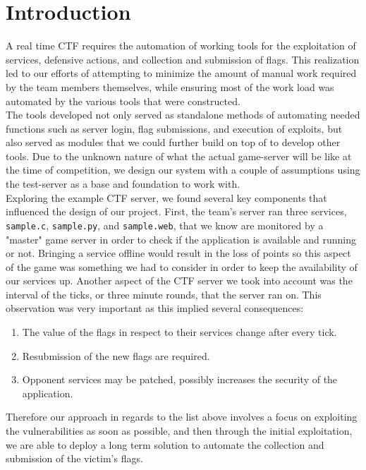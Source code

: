 \documentclass[12pt]{report}
\begin{document}
\section*{Introduction}
A real time CTF requires the automation of working tools for the exploitation of services, defensive actions, and collection and submission of flags. This realization led to our efforts of attempting to minimize the amount of manual work required by the team members themselves, while ensuring most of the work load was automated by the various tools that were constructed. \\

The tools developed not only served as standalone methods of automating needed functions such as server login, flag submissions, and execution of exploits, but also served as modules that we could further build on top of to develop other tools. Due to the unknown nature of what the actual game-server will be like at the time of competition, we design our system with a couple of assumptions using the test-server as a base and foundation to work with. \\

Exploring the example CTF server, we found several key components that influenced the design of our project. First, the team's server ran three services, \texttt{sample.c}, \texttt{sample.py}, and \texttt{sample.web}, that we know are monitored by a "master" game server in order to check if the application is available and running or not. Bringing a service offline would result in the loss of points so this aspect of the game was something we had to consider in order to keep the availability of our services up. Another aspect of the CTF server we took into account was the interval of the ticks, or three minute rounds, that the server ran on. This observation was very important as this implied several consequences: \\

\begin{enumerate}
	\item The value of the flags in respect to their services change after every tick.
	\item Resubmission of the new flags are required.
	\item Opponent services may be patched, possibly increases the security of the application.
	
\end{enumerate}
Therefore our approach in regards to the list above involves a focus on exploiting the vulnerabilities as soon as possible, and then through the initial exploitation, we are able to deploy a long term solution to automate the collection and submission of the victim's flags. \\
\end{document}
